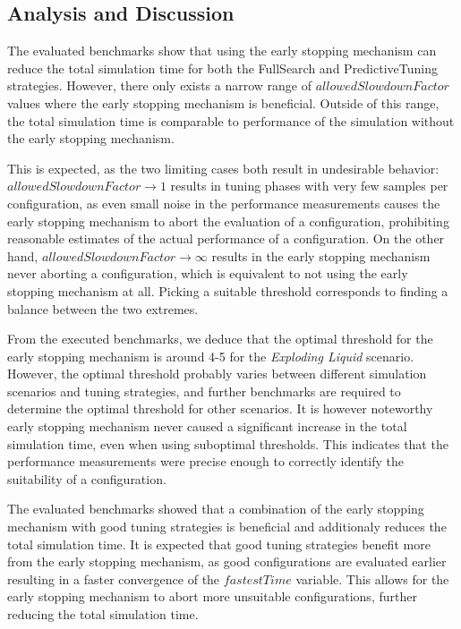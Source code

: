 \documentclass[conference]{IEEEtran}
\begin{document}
\subsection{Analysis and Discussion}
\begin{description}[leftmargin=1.2em, font=\itshape]
    \item[Optimal Thresholds:]
        The evaluated benchmarks show that using the early stopping mechanism can reduce the total simulation time for both the FullSearch and PredictiveTuning strategies. However, there only exists a narrow range of $allowedSlowdownFactor$ values where the early stopping mechanism is beneficial. Outside of this range, the total simulation time is comparable to performance of the simulation without the early stopping mechanism.

        This is expected, as the two limiting cases both result in undesirable behavior: $allowedSlowdownFactor \to 1$ results in tuning phases with very few samples per configuration, as even small noise in the performance measurements causes the early stopping mechanism to abort the evaluation of a configuration, prohibiting reasonable estimates of the actual performance of a configuration. On the other hand, $allowedSlowdownFactor \to \infty$ results in the early stopping mechanism never aborting a configuration, which is equivalent to not using the early stopping mechanism at all. Picking a suitable threshold corresponds to finding a balance between the two extremes.

        From the executed benchmarks, we deduce that the optimal threshold for the early stopping mechanism is around 4-5 for the \textit{Exploding Liquid} scenario. However, the optimal threshold probably varies between different simulation scenarios and tuning strategies, and further benchmarks are required to determine the optimal threshold for other scenarios. It is however noteworthy early stopping mechanism never caused a significant increase in the total simulation time, even when using suboptimal thresholds. This indicates that the performance measurements were precise enough to correctly identify the suitability of a configuration.

    \item[Combination with Tuning Strategies:]
        The evaluated benchmarks showed that a combination of the early stopping mechanism with good tuning strategies is beneficial and additionaly reduces the total simulation time. It is expected that good tuning strategies benefit more from the early stopping mechanism, as good configurations are evaluated earlier resulting in a faster convergence of the $fastestTime$ variable. This allows for the early stopping mechanism to abort more unsuitable configurations, further reducing the total simulation time.


\end{description}
\end{document}
